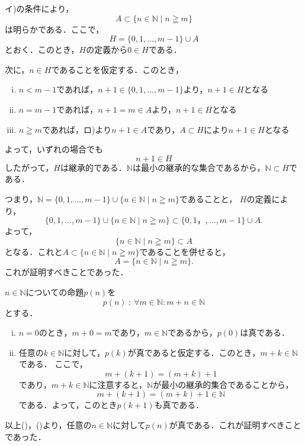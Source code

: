 
\begin{tproof}
    イ)の条件により，
    \[
        A \subset \{n \in \mathbb{N} \mid n \geqq m\}
    \]
    は明らかである．ここで，
    \[
        H=\{0,1,\dots,m-1\} \cup A
    \]
    とおく．このとき，$H$の定義から$0 \in H$である．

    次に，$n \in H$であることを仮定する．このとき，
    \begin{enumerate}[(i)]
        \item  $n<m-1$であれば，$n+1 \in \{0,1,\dots,m-1\}$より，$n+1 \in H$となる
        \item $n=m-1$であれば，$n+1=m \in A$より，$n+1 \in H$となる
        \item $n \geqq m$であれば，ロ)より$n+1 \in A$であり，$A \subset H $により$n + 1\in H$となる
    \end{enumerate}
    よって，いずれの場合でも
    \[
        n+1 \in H
    \]
    したがって，$H$は継承的である．$\mathbb{N}$は最小の継承的な集合であるから，$\mathbb{N} \subset H$である．

    つまり，$\mathbb{N} =  \{0,1,\dots,m-1\} \cup \{n \in \mathbb{N} \mid n \geqq m \}$であることと，
    $H$の定義により，
    \[
        \{0,1,\dots,m-1\} \cup \{n \in \mathbb{N} \mid n \geqq m \} \subset \{0,1，,\dots,m-1\} \cup A.
    \]
    よって，
    \[
        \{n \in \mathbb{N}\mid n \geqq m \} \subset A
    \]
    となる．これと$ A \subset \{n \in \mathbb{N} \mid n \geqq m\}$であることを併せると，
    \[
        A=\{n \in \mathbb{N} \mid n \geqq m \}.
    \]
    これが証明すべきことであった．
\end{tproof}





\begin{tproof}
    $n \in \mathbb{N}$についての命題$p(n)$を
    \[
        p(n) ~{:}~ \forall m \in \mathbb{N} \colon  m+n \in \mathbb{N}
    \]
    とする．
    \begin{enumerate}[(i)]
        \item $n=0$のとき，$m+0=m$であり，$m \in \mathbb{N}$であるから，$p(0)$は真である．
        \item 任意の$k \in \mathbb{N}$に対して，$p(k)$が真であると仮定する．このとき，$m+k \in \mathbb{N}$である．
              ここで，
              \[
                  m+(k+1)=(m+k)+1
              \] であり，$m+k \in \mathbb{N}$に注意すると，$\mathbb{N}$が最小の継承的集合であることから，
              \[
                  m+(k+1)=(m+k)+1  \in \mathbb{N}
              \]
              である．よって，このとき$p(k+1)$も真である．
    \end{enumerate}
    以上()，()より，任意の$n \in \mathbb{N}$に対して$p(n)$が真である．これが証明すべきことであった．
\end{tproof}


